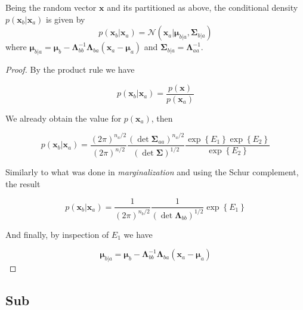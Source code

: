 \begin{appendices}
  \begin{theorem}[Conditioning]
    Being the random vector $\mathbf{x}$ and its partitioned as above, the conditional density $p(\mathbf{x}_b | \mathbf{x}_a)$ is given by
    \begin{displaymath}
      p(\mathbf{x}_b | \mathbf{x}_a) = \mathcal{N}\left( \mathbf{x}_a | \boldsymbol{\mu}_{b|a}, \boldsymbol{\Sigma}_{b|a} \right)
    \end{displaymath}
    where $\boldsymbol{\mu}_{b|a} = \boldsymbol{\mu}_{b}-\boldsymbol{\Lambda}_{b b}^{-1} \boldsymbol{\Lambda}_{b a}\left(\mathbf{x}_{a}-\boldsymbol{\mu}_{a}\right)$ and $\boldsymbol{\Sigma}_{b|a} = \boldsymbol{\Lambda}_{aa}^{-1}$.
  \end{theorem}

  \begin{proof}
    By the product rule we have

    \begin{equation}
      p(\mathbf{x}_b|\mathbf{x}_a)=\frac{p(\mathbf{x})}{p(\mathbf{x}_a)}
    \end{equation}

    We already obtain the value for $p(\mathbf{x}_a)$, then

    \begin{equation}
      p(\mathbf{x}_b|\mathbf{x}_a)=\frac{(2 \pi )^{n_a/2}}{\left( 2 \pi \right)^{n/2}} \frac{( \det \mathbf{\Sigma}_{aa} )^{n_a/2}}{\left( \det \boldsymbol{\Sigma} \right)^{1/2}} \frac{\exp \left\{ E_1 \right\} \exp \left\{ E_2 \right\}}{\exp \left\{ E_2 \right\}}
    \end{equation}
    
    Similarly to what was done in \textit{marginalization} and using the Schur complement, the result

    \begin{equation}
      p(\mathbf{x}_b|\mathbf{x}_a)=\frac{1}{\left( 2 \pi \right)^{n_b/2}} \frac{1}{\left( \det \boldsymbol{\Lambda}_{bb} \right)^{1/2}} \exp \left\{ E_1 \right\}
    \end{equation}

    And finally, by inspection of $E_1$ we have

    \begin{equation}
      \boldsymbol{\mu}_{b|a} =  \boldsymbol{\mu}_{b}-\boldsymbol{\Lambda}_{b b}^{-1} \boldsymbol{\Lambda}_{b a}\left(\mathbf{x}_{a}-\boldsymbol{\mu}_{a}\right)
    \end{equation}
  \end{proof}
  
  

  \subsection{Sub}

\end{appendices}